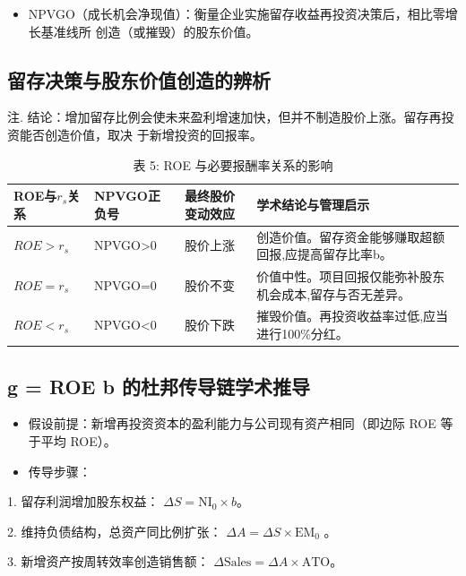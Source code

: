 \documentclass[lang=cn,10pt,color=blue]{elegantbook}
\begin{document}
\begin{itemize}
  \item NPVGO（成长机会净现值）：衡量企业实施留存收益再投资决策后，相比零增长基准线所 创造（或摧毁）的股东价值。
\end{itemize}

\subsection{留存决策与股东价值创造的辨析}

注. 结论：增加留存比例会使未来盈利增速加快，但并不制造股价上涨。留存再投资能否创造价值，取决 于新增投资的回报率。 

\begin{table}[ht]
  \centering
  \caption{表 5: ROE 与必要报酬率关系的影响}
  \renewcommand{\arraystretch}{1.4}
\begin{tabularx}{\textwidth}{llYY}
  \toprule
  ROE与$r_s$关系 & NPVGO正负号 & 最终股价变动效应 & 学术结论与管理启示 \\
  \midrule
  $ROE > r_s$ & NPVGO>0 & 股价上涨 & 创造价值。留存资金能够赚取超额回报,应提高留存比率b。 \\
  $ROE = r_s$ & NPVGO=0 & 股价不变 & 价值中性。项目回报仅能弥补股东机会成本,留存与否无差异。 \\
  $ROE < r_s$ & NPVGO<0 & 股价下跌 & 摧毁价值。再投资收益率过低,应当进行100\%分红。 \\
  \bottomrule
\end{tabularx}
\end{table}

\subsection{g = ROE  b 的杜邦传导链学术推导}

\begin{itemize}
  \item 假设前提：新增再投资资本的盈利能力与公司现有资产相同（即边际 ROE 等于平均 ROE）。

  \item 传导步骤：
\end{itemize}

1. 留存利润增加股东权益： $\Delta S = \mathrm { N I _ { 0 } } \times b$。 

2. 维持负债结构，总资产同比例扩张： $\Delta A = \Delta S \times \mathrm{EM}_{0}$ 。 

3. 新增资产按周转效率创造销售额： $\Delta \mathrm { S a l e s } = \Delta A \times \mathrm{ATO}$。 
\end{document}
